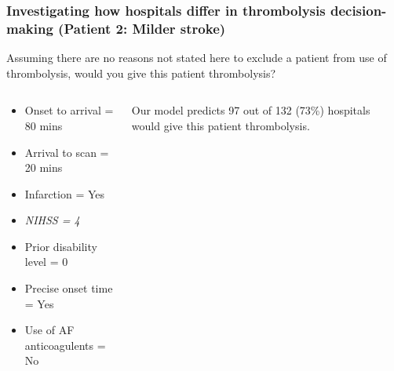 \documentclass{beamer}
\begin{document}
\begin{frame}
\frametitle{Investigating how hospitals differ in thrombolysis decision-making (Patient 2: Milder stroke)}

Assuming there are no reasons not stated here to exclude a patient from use of thrombolysis, would you give this patient thrombolysis?

\vspace{3mm}

\begin{columns}
    \begin{column}{0.5\textwidth}
        \begin{itemize}
            \item Onset to arrival = 80 mins
            \item Arrival to scan = 20 mins
            \item Infarction = Yes
            \item \emph{NIHSS = 4}
            \item Prior disability level = 0
            \item Precise onset time = Yes
            \item Use of AF anticoagulents = No
        \end{itemize}
    \end{column}
    
    \begin{column}{0.4\textwidth}
    Our model predicts 97 out of 132 (73\%) hospitals would give this patient thrombolysis.
    \end{column}

\end{columns}
\end{frame}

\end{document}
